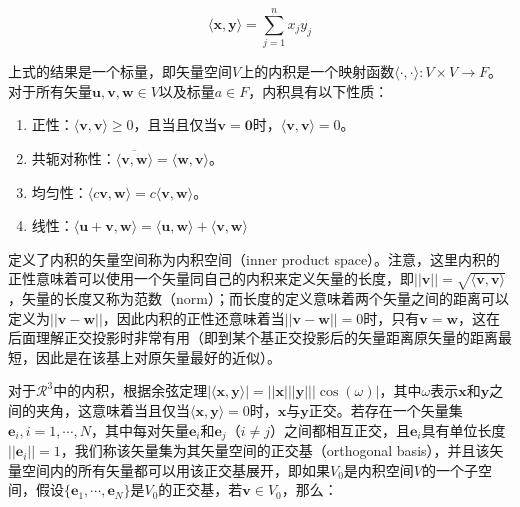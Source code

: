 \begin{equation}\label{e:r-inner-product}
	\langle \mathbf{x},\mathbf{y}\rangle =\sum^{n}_{j=1}x_jy_j
\end{equation}

\noindent 上式的结果是一个标量，即矢量空间$V$上的内积是一个映射函数$\langle\cdot,\cdot\rangle:V\times V\to F$。对于所有矢量$\mathbf{u},\mathbf{v},\mathbf{w}\in V$以及标量$a\in F$，内积具有以下性质：

\begin{enumerate}
	\item 正性：$\langle \mathbf{v},\mathbf{v}\rangle\geq 0$，且当且仅当$\mathbf{v}=\mathbf{0}$时，$\langle \mathbf{v},\mathbf{v}\rangle= 0$。
	\item 共轭对称性：$\overline{\langle \mathbf{v},\mathbf{w}\rangle}=\langle \mathbf{w},\mathbf{v}\rangle$。
	\item 均匀性：$\langle c\mathbf{v},\mathbf{w}\rangle=c\langle \mathbf{v},\mathbf{w}\rangle$。
	\item 线性：$\langle \mathbf{u}+\mathbf{v},\mathbf{w}\rangle=\langle \mathbf{u},\mathbf{w}\rangle+\langle \mathbf{v},\mathbf{w}\rangle$
\end{enumerate}

定义了内积的矢量空间称为内积空间（inner product space）。注意，这里内积的正性意味着可以使用一个矢量同自己的内积来定义矢量的长度，即$||\mathbf{v}||=\sqrt{\langle \mathbf{v},\mathbf{v}\rangle}$，矢量的长度又称为范数（norm）；而长度的定义意味着两个矢量之间的距离可以定义为$||\mathbf{v}-\mathbf{w}||$，因此内积的正性还意味着当$||\mathbf{v}-\mathbf{w}||=0$时，只有$\mathbf{v}=\mathbf{w}$，这在后面理解正交投影时非常有用（即到某个基正交投影后的矢量距离原矢量的距离最短，因此是在该基上对原矢量最好的近似）。

对于$\mathcal{R}^{3}$中的内积，根据余弦定理$|\langle\mathbf{x},\mathbf{y}\rangle |=||\mathbf{x}|||\mathbf{y}|||\cos({\omega})|$，其中${\omega}$表示$\mathbf{x}$和$\mathbf{y}$之间的夹角，这意味着当且仅当$\langle\mathbf{x},\mathbf{y}\rangle=0$时，$\mathbf{x}$与$\mathbf{y}$正交。若存在一个矢量集$\mathbf{e}_i,i=1,\cdots,N$，其中每对矢量$\mathbf{e}_i$和$\mathbf{e}_j$（$i\neq j$）之间都相互正交，且$\mathbf{e}_i$具有单位长度$||\mathbf{e}_i||=1$，我们称该矢量集为其矢量空间的正交基（orthogonal basis），并且该矢量空间内的所有矢量都可以用该正交基展开，即如果$V_0$是内积空间$V$的一个子空间，假设$\{\mathbf{e}_1,\cdots,\mathbf{e}_N\}$是$V_0$的正交基，若$\mathbf{v}\in V_0$，那么：

